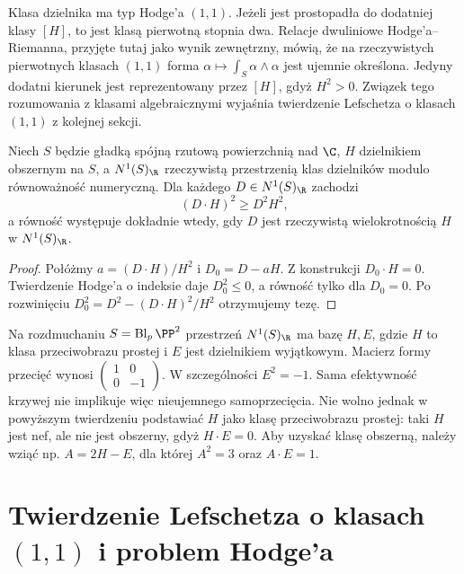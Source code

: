 \begin{uwaga}
Klasa dzielnika ma typ Hodge'a $(1,1)$.
Jeżeli jest prostopadła do dodatniej klasy $[H]$, to jest
klasą pierwotną stopnia dwa. Relacje dwuliniowe
Hodge'a--Riemanna, przyjęte tutaj jako wynik zewnętrzny,
mówią, że na rzeczywistych pierwotnych klasach $(1,1)$
forma $\alpha\mapsto\int_S\alpha\wedge\alpha$ jest ujemnie
określona. Jedyny dodatni kierunek jest reprezentowany
przez $[H]$, gdyż $H^2>0$. Związek tego rozumowania
z klasami algebraicznymi wyjaśnia twierdzenie Lefschetza
o klasach $(1,1)$ z kolejnej sekcji.
\end{uwaga}

\begin{stwierdzenie}
\label{st:ga10-hodge-ineq}
Niech $S$ będzie gładką spójną rzutową powierzchnią
nad $\C$, $H$ dzielnikiem obszernym na $S$,
a $N^1(S)_{\R}$ rzeczywistą przestrzenią klas dzielników
modulo równoważność numeryczną. Dla każdego
$D\in N^1(S)_{\R}$ zachodzi
\[
 (D\cdot H)^2\ge D^2H^2,
\]
a równość występuje dokładnie wtedy, gdy $D$ jest
rzeczywistą wielokrotnością $H$ w $N^1(S)_{\R}$.
\end{stwierdzenie}
\begin{proof}
Połóżmy $a=(D\cdot H)/H^2$ i $D_0=D-aH$.
Z konstrukcji $D_0\cdot H=0$.
Twierdzenie Hodge'a o indeksie daje $D_0^2\le0$,
a równość tylko dla $D_0=0$. Po rozwinięciu
$D_0^2=D^2-(D\cdot H)^2/H^2$ otrzymujemy tezę.
\end{proof}

\begin{przyklad}
Na rozdmuchaniu $S=\operatorname{Bl}_p\PP^2$
przestrzeń $N^1(S)_{\R}$ ma bazę $H,E$,
gdzie $H$ to klasa przeciwobrazu prostej i $E$ jest dzielnikiem
wyjątkowym. Macierz formy przecięć wynosi
$\left(\begin{smallmatrix}1&0\\0&-1\end{smallmatrix}\right)$.
W szczególności $E^2=-1$. Sama efektywność krzywej
nie implikuje więc nieujemnego samoprzecięcia.
Nie wolno jednak w powyższym twierdzeniu podstawiać
$H$ jako klasę przeciwobrazu prostej: taki $H$ jest nef, ale
nie jest obszerny, gdyż $H\cdot E=0$.
Aby uzyskać klasę obszerną, należy wziąć np.
$A=2H-E$, dla której $A^2=3$ oraz $A\cdot E=1$.
\end{przyklad}

\section{Twierdzenie Lefschetza o klasach \texorpdfstring{$(1,1)$}{(1,1)} i problem Hodge'a}
\label{sec:ga10-11}

